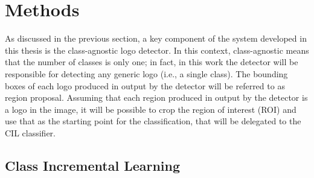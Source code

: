 \chapter{Methods}
\label{chap:methods}

As discussed in the previous section, a key component of the system developed in this thesis is the class-agnostic logo detector. In this context, class-agnostic means that the number of classes is only one; in fact, in this work the detector will be responsible for detecting any generic logo (i.e., a single class). The bounding boxes of each logo produced in output by the detector will be referred to as region proposal. Assuming that each region produced in output by the detector is a logo in the image, it will be possible to crop the region of interest (ROI) and use that as the starting point for the classification, that will be delegated to the CIL classifier.

\section{Class Incremental Learning}
\label{sec:method-cil}